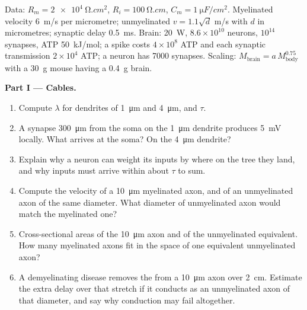 \begin{problem}
\label{pb:b3:nervous-systems:1}
Data: $R_{m} = \qty{2e4}{\ohm.cm^2}$, $R_{i} = \qty{100}{\ohm.cm}$,
$C_{m} = \qty{1}{\micro F/cm^2}$. Myelinated velocity \qty{6}{m/s} per
micrometre; unmyelinated $v = 1.1\sqrt{d}$ m/s with $d$ in
micrometres; synaptic delay \qty{0.5}{ms}. Brain: \qty{20}{W},
$8.6\times 10^{10}$ neurons, $10^{14}$ synapses, ATP \qty{50}{kJ/mol};
a spike costs $4\times 10^{8}$ ATP and each synaptic transmission
$2\times 10^{4}$ ATP; a neuron has \num{7000} synapses. Scaling:
$M_{\text{brain}} = a\,M_{\text{body}}^{0.75}$ with a \qty{30}{g} mouse
having a \qty{0.4}{g} brain.

\medskip
\noindent\textbf{Part I --- Cables.}
\begin{enumerate}
  \item Compute $\lambda$ for dendrites of \qty{1}{\micro m} and
        \qty{4}{\micro m}, and $\tau$.
  \item A synapse \qty{300}{\micro m} from the soma on the
        \qty{1}{\micro m} dendrite produces \qty{5}{mV} locally. What
        arrives at the soma? On the \qty{4}{\micro m} dendrite?
  \item Explain why a neuron can weight its inputs by where on the
        tree they land, and why inputs must arrive within about $\tau$
        to sum.
  \item Compute the velocity of a \qty{10}{\micro m} myelinated axon,
        and of an unmyelinated axon of the same diameter. What diameter
        of unmyelinated axon would match the myelinated one?
  \item Cross-sectional areas of the \qty{10}{\micro m} axon and of the
        unmyelinated equivalent. How many myelinated axons fit in the
        space of one equivalent unmyelinated axon?
  \item A demyelinating disease removes the  from a
        \qty{10}{\micro m} axon over \qty{2}{cm}. Estimate the extra
        delay over that stretch if it conducts as an unmyelinated axon
        of that diameter, and say why conduction may fail altogether.
\end{enumerate}


\end{problem}
